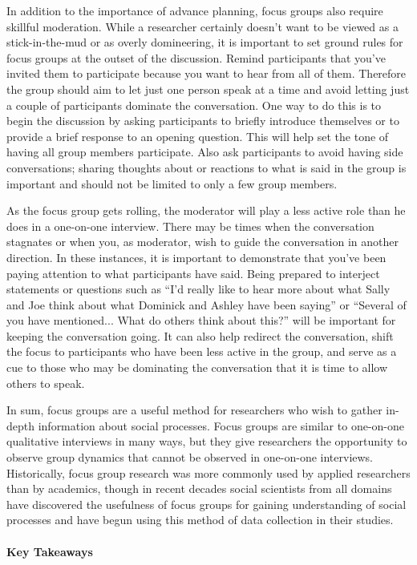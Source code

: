 In addition to the importance of advance planning, focus groups also require skillful moderation. While a researcher certainly doesn’t want to be viewed as a stick-in-the-mud or as overly domineering, it is important to set ground rules for focus groups at the outset of the discussion. Remind participants that you’ve invited them to participate because you want to hear from all of them. Therefore the group should aim to let just one person speak at a time and avoid letting just a couple of participants dominate the conversation. One way to do this is to begin the discussion by asking participants to briefly introduce themselves or to provide a brief response to an opening question. This will help set the tone of having all group members participate. Also ask participants to avoid having side conversations; sharing thoughts about or reactions to what is said in the group is important and should not be limited to only a few group members.

As the focus group gets rolling, the moderator will play a less active role than he does in a one-on-one interview. There may be times when the conversation stagnates or when you, as moderator, wish to guide the conversation in another direction. In these instances, it is important to demonstrate that you’ve been paying attention to what participants have said. Being prepared to interject statements or questions such as “I’d really like to hear more about what Sally and Joe think about what Dominick and Ashley have been saying” or “Several of you have mentioned... What do others think about this?” will be important for keeping the conversation going. It can also help redirect the conversation, shift the focus to participants who have been less active in the group, and serve as a cue to those who may be dominating the conversation that it is time to allow others to speak.

In sum, focus groups are a useful method for researchers who wish to gather in-depth information about social processes. Focus groups are similar to one-on-one qualitative interviews in many ways, but they give researchers the opportunity to observe group dynamics that cannot be observed in one-on-one interviews. Historically, focus group research was more commonly used by applied researchers than by academics, though in recent decades social scientists from all domains have discovered the usefulness of focus groups for gaining understanding of social processes and have begun using this method of data collection in their studies.

\paragraph{Key Takeaways}


